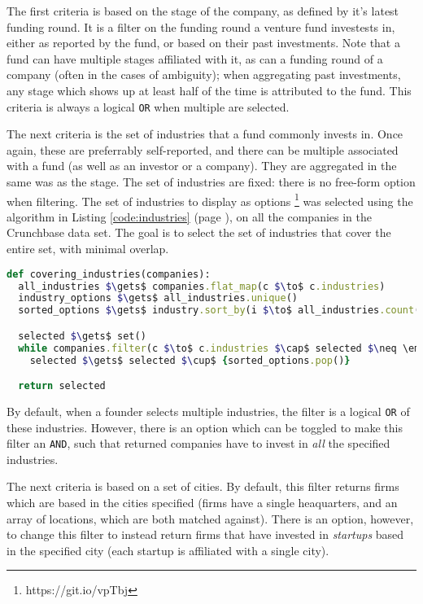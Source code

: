 The first criteria is based on the stage of the company, as defined by it's latest funding round. It is a filter on the funding round a venture fund investests in, either as reported by the fund, or based on their past investments. Note that a fund can have multiple stages affiliated with it, as can a funding round of a company (often in the cases of ambiguity); when aggregating past investments, any stage which shows up at least half of the time is attributed to the fund. This criteria is always a logical \texttt{OR} when multiple are selected.

The next criteria is the set of industries that a fund commonly invests in. Once again, these are preferrably self-reported, and there can be multiple associated with a fund (as well as an investor or a company). They are aggregated in the same was as the stage. The set of industries are fixed: there is no free-form option when filtering. The set of industries to display as options \footnote{https://git.io/vpTbj} was selected using the algorithm in Listing \ref{code:industries} (page \pageref{code:industries}), on all the companies in the Crunchbase data set. The goal is to select the set of industries that cover the entire set, with minimal overlap.

\begin{lstlisting}[float,frame=single,mathescape=true,language=Ruby,basicstyle=\footnotesize,columns=fullflexible,caption={Display Industries},label={code:industries}]
def covering_industries(companies):
  all_industries $\gets$ companies.flat_map(c $\to$ c.industries)
  industry_options $\gets$ all_industries.unique()
  sorted_options $\gets$ industry.sort_by(i $\to$ all_industries.count(i))

  selected $\gets$ set()
  while companies.filter(c $\to$ c.industries $\cap$ selected $\neq \emptyset$).count() > 0:
    selected $\gets$ selected $\cup$ {sorted_options.pop()}

  return selected
\end{lstlisting}

By default, when a founder selects multiple industries, the filter is a logical \texttt{OR} of these industries. However, there is an option which can be toggled to make this filter an \texttt{AND}, such that returned companies have to invest in \textit{all} the specified industries.

The next criteria is based on a set of cities. By default, this filter returns firms which are based in the cities specified (firms have a single heaquarters, and an array of locations, which are both matched against). There is an option, however, to change this filter to instead return firms that have invested in \textit{startups} based in the specified city (each startup is affiliated with a single city).

